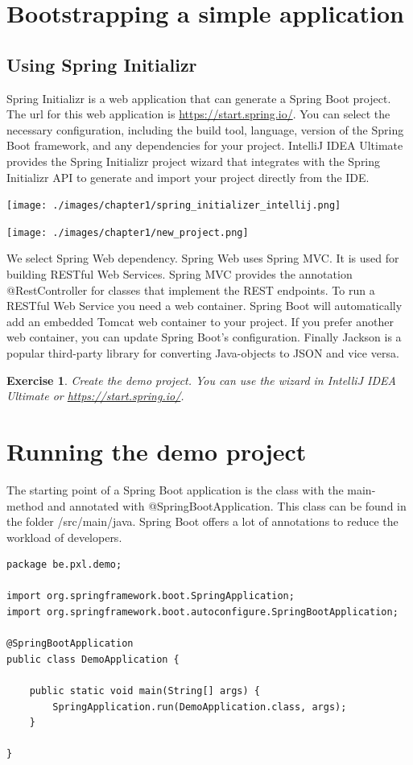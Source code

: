 \documentclass[a4paper, 12pt]{report}
\newenvironment{boxexercise}
{\begin{tcolorbox}
[enhanced jigsaw,breakable,pad at break*=1mm,
 colback=tsyellow!20,boxrule=0pt,frame hidden]}
{\end{tcolorbox}}
\newtheorem{envoefening}{\textbf{Exercise}}[chapter]
\newenvironment{oefening}
               {\begin{boxexercise}\begin{envoefening}}
               {\end{envoefening}\end{boxexercise}}
\begin{document}
\section{Bootstrapping a simple application}

\subsection{Using Spring Initializr}
Spring Initializr is a web application that can generate a Spring Boot project.
The url for this web application is \url{https://start.spring.io/}. You can select the necessary configuration, including the build tool, language, version of the Spring Boot framework, and any dependencies for your project. IntelliJ IDEA Ultimate provides the Spring Initializr project wizard that integrates with the Spring Initializr API to generate and import your project directly from the IDE.

\texttt{[image: ./images/chapter1/spring\_initializer\_intellij.png]}

\texttt{[image: ./images/chapter1/new\_project.png]}

We select Spring Web dependency. Spring Web uses Spring MVC. It is used for building RESTful Web Services. Spring MVC provides the annotation @RestController for classes that implement the REST endpoints.
To run a RESTful Web Service you need a web container. Spring Boot will automatically add an embedded Tomcat web container to your project. If you prefer another web container, you can update Spring Boot's configuration.
Finally Jackson is a popular third-party library for converting Java-objects to JSON and vice versa.

\begin{oefening}
Create the demo project. You can use the wizard in IntelliJ IDEA Ultimate or \url{https://start.spring.io/}.
\end{oefening}

\section{Running the demo project}

The starting point of a Spring Boot application is the class with the main-method and annotated with @SpringBootApplication.  This class can be found in the folder /src/main/java.  Spring Boot offers a lot of annotations to reduce the workload of developers.   

\begin{lstlisting}[frame=single]
package be.pxl.demo;

import org.springframework.boot.SpringApplication;
import org.springframework.boot.autoconfigure.SpringBootApplication;

@SpringBootApplication
public class DemoApplication {

    public static void main(String[] args) {
        SpringApplication.run(DemoApplication.class, args);
    }

}
\end{lstlisting}
\end{document}
